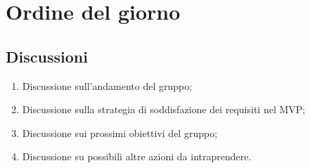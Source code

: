 \section{Ordine del giorno} 
\label{sec:agenda}
\subsection{Discussioni} 
\label{subsec:discussione}
\begin{enumerate}
    \item Discussione sull'andamento del gruppo;
    \item Discussione sulla strategia di soddisfazione dei requisiti nel MVP;
    \item Discussione sui prossimi obiettivi del gruppo;
    \item Discussione su possibili altre azioni da intraprendere.
\end{enumerate}